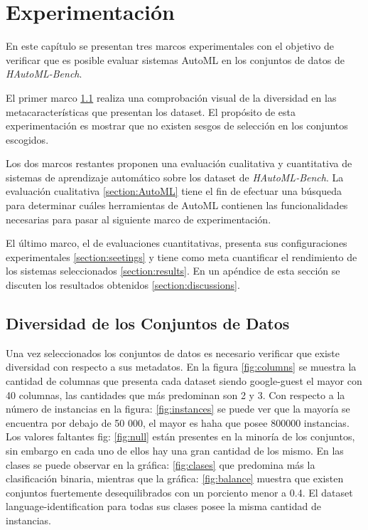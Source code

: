 \chapter{Experimentación}\label{chapter:experiments}
En este capítulo se presentan tres marcos experimentales con el objetivo de verificar que es posible evaluar sistemas AutoML en los conjuntos de datos de 
\textit{HAutoML-Bench}. 

El primer marco \ref{section:diversidad} realiza una comprobación visual de la diversidad en las metacaracterísticas que presentan los dataset. El propósito 
de esta experimentación es mostrar que no existen sesgos de selección en los conjuntos escogidos.

Los dos marcos restantes proponen una evaluación cualitativa y cuantitativa de sistemas de aprendizaje automático sobre los dataset de \textit{HAutoML-Bench}.
La evaluación cualitativa \ref{section:AutoML} tiene el fin de efectuar una búsqueda para determinar cuáles herramientas de AutoML contienen 
las funcionalidades necesarias para pasar al siguiente marco de experimentación.

El último marco, el de evaluaciones cuantitativas, presenta sus configuraciones experimentales \ref{section:seetings} y tiene como meta cuantificar el 
rendimiento de los sistemas seleccionados \ref{section:results}. En un apéndice de esta sección se discuten los resultados obtenidos \ref{section:discussions}.

\section{Diversidad de los Conjuntos de Datos}\label{section:diversidad}

Una vez seleccionados los conjuntos de datos es necesario verificar que existe diversidad con respecto a sus metadatos.   
En la figura \ref{fig:columns} se muestra la cantidad de columnas que presenta cada dataset siendo google-guest el mayor con 40 columnas, las cantidades que más predominan son 2 y 3.
Con respecto a la número de instancias en la figura: \ref{fig:instances} se puede ver que la mayoría se encuentra por debajo de 50 000, el mayor es haha que posee 800000 instancias. 
Los valores faltantes fig: \ref{fig:null} están presentes en la minoría de los conjuntos, sin embargo en cada uno de ellos hay una gran cantidad de los mismo. 
En las clases se puede observar en la gráfica: \ref{fig:clases} que predomina más la clasificación binaria, mientras que la gráfica: \ref{fig:balance} muestra que existen conjuntos fuertemente desequilibrados con un porciento menor a 0.4. 
El dataset language-identification para todas sus clases posee la misma cantidad de instancias.

